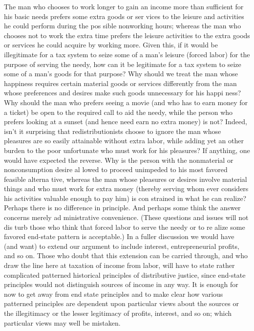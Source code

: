 \documentclass[11pt,openany]{book}
\begin{document}
The man who chooses to work longer to gain an income more than sufficient for his basic needs prefers some extra goods or ser vices to the leisure and activities he could perform during the pos sible nonworking hours; whereas the man who chooses not to work the extra time prefers the leisure activities to the extra goods or services he could acquire by working more. Given this, if it would be illegitimate for a tax system to seize some of a man's leisure (forced labor) for the purpose of serving the needy, how can it be legitimate for a tax system to seize some of a man's goods for that purpose? Why should we treat the man whose happiness requires certain material goods or services differently from the man whose preferences and desires make such goods unnecessary for his happi ness? Why should the man who prefers seeing a movie (and who has to earn money for a ticket) be open to the required call to aid the needy, while the person who prefers looking at a sunset (and hence need earn no extra money) is not? Indeed, isn't it surprising that redistributionists choose to ignore the man whose pleasures are so easily attainable without extra labor, while adding yet an other burden to the poor unfortunate who must work for his pleasures? If anything, one would have expected the reverse. Why is the person with the nonmaterial or nonconsumption desire al lowed to proceed unimpeded to his most favored feasible alterna tive, whereas the man whose pleasures or desires involve material things and who must work for extra money (thereby serving whom ever considers his activities valuable enough to pay him) is con strained in what he can realize? Perhaps there is no difference in principle. And perhaps some think the answer concerns merely ad ministrative convenience. (These questions and issues will not dis turb those who think that forced labor to serve the needy or to re alize some favored end-state pattern is acceptable.) In a fuller discussion we would have (and want) to extend our argument to include interest, entrepreneurial profits, and so on. Those who doubt that this extension can be carried through, and who draw the line here at taxation of income from labor, will have to state rather complicated patterned historical principles of distributive justice, since end-state principles would not distinguish sources of income in any way. It is enough for now to get away from end state principles and to make clear how various patterned principles are dependent upon particular views about the sources or the illegitimacy or the lesser legitimacy of profits, interest, and so on; which particular views may well be mistaken. 
\end{document}
